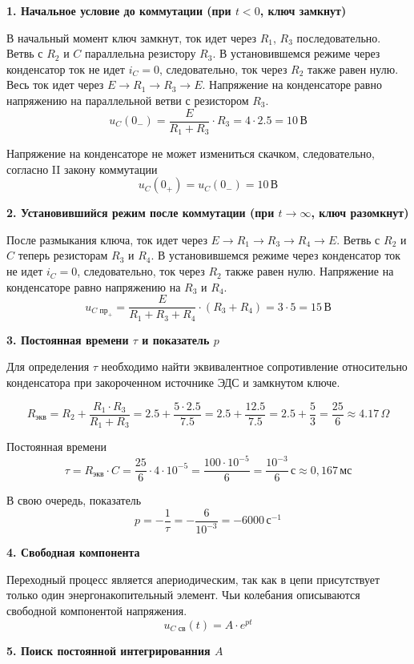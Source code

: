 \documentclass[12pt]{article}
\begin{document}
\textbf{1. Начальное условие до коммутации (при $t < 0$, ключ замкнут)}

В начальный момент ключ замкнут, ток идет через $R_1$, $R_3$ последовательно. Ветвь с $R_2$ и $C$ параллельна резистору $R_3$.
В установившемся режиме через конденсатор ток не идет $i_C = 0$, следовательно, ток через $R_2$ также равен нулю. Весь ток идет через $E \to R_1 \to R_3\to E$.
Напряжение на конденсаторе равно напряжению на параллельной ветви с резистором $R_3$.
\[
u_C(0_-) = \frac{E}{R_1 + R_3} \cdot R_3 = 4 \cdot 2.5 = 10\,\text{В}
\]

Напряжение на конденсаторе не может измениться скачком, следовательно, согласно II закону коммутации
\[
u_C(0_+) = u_C(0_-) = 10\,\text{В}
\]

\textbf{2. Установившийся режим после коммутации (при $t \to \infty$, ключ разомкнут)}

После размыкания ключа, ток идет через $E\to R_1 \to R_3\to R_4 \to E$. Ветвь с $R_2$ и $C$ теперь резисторам $R_3$ и $R_4$.
В установившемся режиме через конденсатор ток не идет $i_C = 0$, следовательно, ток через $R_2$ также равен нулю.
Напряжение на конденсаторе равно напряжению на $R_3$ и $R_4$.
\[
u_{C\text{ пр}_+} = \frac{E}{R_1 + R_3 + R_4} \cdot (R_3 + R_4) = 3 \cdot 5 = 15\,\text{В}
\]

\textbf{3. Постоянная времени $\tau$ и показатель $p$}

Для определения $\tau$ необходимо найти эквивалентное сопротивление относительно конденсатора при закороченном источнике ЭДС и замкнутом ключе.

\[
R_{\text{экв}} = R_2 + \frac{R_1 \cdot R_3}{R_1 + R_3} = 2.5 + \frac{5 \cdot 2.5}{7.5} = 2.5 + \frac{12.5}{7.5} = 2.5 + \frac{5}{3} = \frac{25}{6} \approx 4.17\,\Omega
\]

Постоянная времени
\[
\tau = R_{\text{экв}} \cdot C = \frac{25}{6} \cdot 4 \cdot 10^{-5} = \frac{100 \cdot 10^{-5}}{6} = \frac{10^{-3}}{6}\,\text{с} \approx 0{,}167\,\text{мс}
\]

В свою очередь, показатель 
\[
p = -\frac{1}{\tau} = -\frac{6}{10^{-3}} = -6000\,\text{с}^{-1}
\]

\textbf{4. Свободная компонента}

Переходный процесс является апериодическим, так как в цепи присутствует только один энергонакопительный элемент. Чьи колебания описываются свободной компонентой напряжения.
\[
u_{C\text{ св}}(t) = A \cdot e^{pt}
\]

\textbf{5. Поиск постоянной интегрированния $A$}
\end{document}
